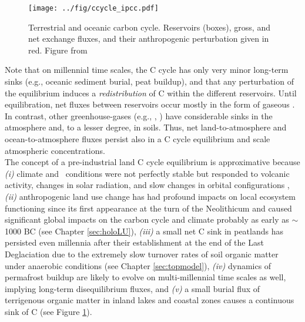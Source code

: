 \begin{figure}[ht!]
\begin{center}
  \texttt{[image: ../fig/ccycle\_ipcc.pdf]}
\end{center}
  \caption[The carbon cycle]{Terrestrial and oceanic carbon cycle. Reservoirs (boxes), gross, and net exchange fluxes, and their anthropogenic perturbation given in red. Figure from \citet{ciais13ipcc}}
\label{fig:ccycle}
\end{figure}

Note that on millennial time scales, the C cycle has only very minor long-term sinks (e.g., oceanic sediment burial, peat buildup), and that any perturbation of the equilibrium induces a {\it redistribution} of C within the different reservoirs. Until equilibration, net fluxes between reservoirs occur mostly in the form of gaseous \coo . In contrast, other greenhouse-gases (e.g., \nno , \chh ) have considerable sinks in the atmosphere and, to a lesser degree, in soils. Thus, net land-to-atmosphere and ocean-to-atmosphere fluxes persist also in a C cycle equilibrium and scale atmospheric concentrations.\\

The concept of a pre-industrial land C cycle equilibrium is approximative because {\it (i)} climate and \coo\ conditions were not perfectly stable but responded to volcanic activity, changes in solar radiation, and slow changes in orbital configurations \citep{wanner08}, {\it (ii)} anthropogenic land use change has had profound impacts on local ecosystem functioning since its first appearance at the turn of the Neolithicum and caused significant global impacts on the carbon cycle and climate probably as early as $\sim$1000 BC (see Chapter \ref{sec:holoLU}), {\it (iii)} a small net C sink in peatlands has persisted even millennia after their establishment at the end of the Last Deglaciation due to the extremely slow turnover rates of soil organic matter under anaerobic conditions (see Chapter \ref{sec:topmodel}), {\it (iv)} dynamics of permafrost buildup are likely to evolve on multi-millennial time scales as well, implying long-term disequilibrium fluxes, and {\it (v)} a small burial flux of terrigenous organic matter in inland lakes and coastal zones causes a continuous sink of C (see Figure \ref{fig:ccycle}).

